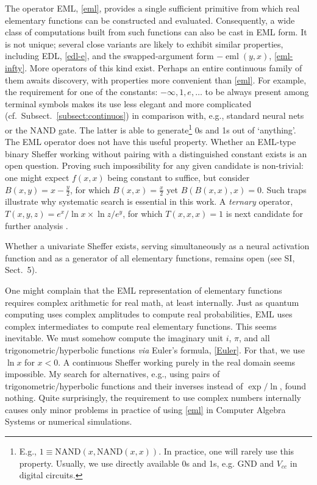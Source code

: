 \documentclass[12pt]{article}
\DeclareMathOperator{\eml}{eml}
\begin{document}
The operator EML, \eqref{eml}, provides a single sufficient primitive from which real elementary functions can be constructed and evaluated.
Consequently, a wide class of computations built from such functions can also be cast in EML form. 
It is not unique; several close variants are likely to exhibit similar properties, including EDL, \eqref{edl-e}, and the swapped-argument form $-\eml(y,x)$, \eqref{eml-infty}.
 More operators of this kind exist. Perhaps an entire continuous family of them awaits discovery, with properties more convenient than \eqref{eml}. For example, the requirement for one of the constants: $-\infty,1,e, \ldots$ to be always present among terminal symbols makes its use less elegant and more complicated (cf.~Subsect.~\ref{subsect:continuos}) in comparison with, e.g., standard neural nets or the NAND gate. The latter is able to generate\footnote{
E.g., $1 \equiv \text{NAND}(x,\text{NAND}(x,x))$. In practice, one will rarely use this property. Usually, we use directly available 0s and 1s, e.g. GND and $V_{cc}$ in digital circuits.} 
0s and 1s out of `anything'. The EML operator does not have this useful property. Whether an EML-type binary Sheffer working without pairing with a distinguished constant exists is an open question. Proving such impossibility for any given candidate is non-trivial: one might expect $f(x,x)$ being constant to suffice, but consider $B(x,y) \! = \!  x \!-\! \tfrac{y}{2}$, for which $B(x,x) \! = \!  \tfrac{x}{2}$ yet $B(B(x,x),x) \! = \! 0$. Such traps illustrate why systematic search is essential in this work. A {\em ternary} operator, $T(x,y,z)\! = \! {e^x}/{\ln{x}} \times {\ln{z}}/{e^y}$, for which $T(x,x,x)\! =\! 1$ is next candidate for further analysis \cite{AO-in-preparation}. 


Whether a univariate Sheffer exists, serving simultaneously as a neural activation function \cite{DubeyActivationSurvey2022} and as a generator of all elementary functions, remains open (see SI, Sect.~5).


One might complain that the EML representation of elementary functions requires complex arithmetic for real math, at least internally. 
Just as quantum computing uses complex amplitudes to compute real probabilities, EML uses complex intermediates to compute real elementary functions. This seems inevitable. We must somehow compute the imaginary unit $i$, $\pi$, and all trigonometric/hyperbolic functions \emph{via} Euler's formula, \eqref{Euler}. For that, we use $\ln{x}$ for $x<0$. A continuous Sheffer working purely in the real domain seems impossible. My search for alternatives, e.g., using pairs of trigonometric/hyperbolic functions and their inverses instead of $\exp/\ln$, found nothing.  Quite surprisingly, the requirement to use complex numbers internally causes only minor problems in practice of using \eqref{eml} in Computer Algebra Systems or numerical simulations.
\end{document}
